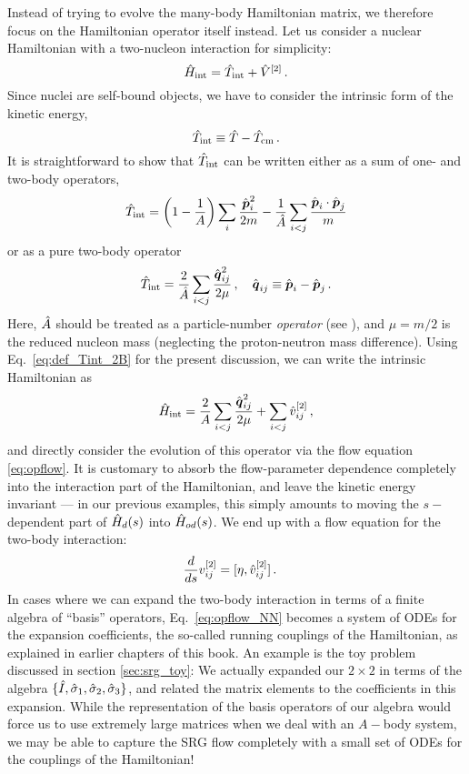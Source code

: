Instead of trying to evolve the many-body Hamiltonian matrix, we therefore focus
on the Hamiltonian operator itself instead. Let us consider a nuclear Hamiltonian 
with a two-nucleon interaction for simplicity:
\begin{equation}
  \hat{H}_\text{int} = \hat{T}_\text{int} + \hat{V}^{[2]}\,.
\end{equation}
Since nuclei are self-bound objects, we have to consider the intrinsic form of the 
kinetic energy, 
\begin{equation}
  \hat{T}_\text{int} \equiv \hat{T} - \hat{T}_\text{cm}\,.
\end{equation}
It is straightforward to show that $\hat{T}_\text{int}$ can be written either as a sum of
one- and two-body operators,
\begin{equation}\label{eq:def_Tint_1B2B}
  \Tint= \left(1-\frac{1}{A}\right)\sum_{i}\frac{\pOV_i^2}{2m} - \frac{1}{\AO}\sum_{i<j}\frac{\pOV_{i}\cdot\pOV_{j}}{m}
\end{equation}
or as a pure two-body operator
\begin{equation}\label{eq:def_Tint_2B}
  \Tint= \frac{2}{\AO}\sum_{i<j}\frac{\qOV_{ij}^2}{2\mu}\,,\quad \qOV_{ij}\equiv\pOV_{i}-\pOV_{j}\,.
\end{equation}
Here, $\hat{A}$ should be treated as a particle-number \emph{operator} (see \cite{Hergert:2009wh}),
and $\mu=m/2$ is the reduced nucleon mass (neglecting the proton-neutron mass difference).
Using Eq.~\eqref{eq:def_Tint_2B} for the present discussion, we can write the intrinsic 
Hamiltonian as
\begin{equation}
  \Hint = \frac{2}{A}\sum_{i<j}\frac{\qOV_{ij}^2}{2\mu} + \sum_{i<j}\vO^{[2]}_{ij}\,,
\end{equation}
and directly consider the evolution of this operator via the flow equation
\eqref{eq:opflow}. It is customary to absorb the flow-parameter dependence 
completely into the interaction part of the Hamiltonian, and leave the kinetic
energy invariant --- in our previous examples, this simply amounts to moving the
$s-$dependent part of $\hat{H}_d(s)$ into $\hat{H}_{od}(s)$. We end up with a flow equation 
for the two-body interaction:
\begin{align}\label{eq:opflow_NN}
  \totd{}{s}v^{[2]}_{ij} &= \comm{\eta}{\vO^{[2]}_{ij}}\,.
\end{align}
In cases where we can expand the two-body interaction in terms of a finite algebra of
``basis'' operators, Eq.~\eqref{eq:opflow_NN} becomes a system of ODEs for the expansion 
coefficients, the so-called running couplings of the Hamiltonian, as explained
in earlier chapters of this book. An example is the toy problem discussed in section 
\ref{sec:srg_toy}: We actually expanded our $2\times2$ in terms of the algebra 
$\{\hat{I},\hat{\sigma}_{1},\hat{\sigma}_{2},\hat{\sigma}_{3}\}$,
and related the matrix elements to the coefficients in this expansion. While 
the representation of the basis operators of our algebra would force us to use
extremely large matrices when we deal with an $A-$body system, we may be able
to capture the SRG flow completely with a small set of ODEs for the couplings 
of the Hamiltonian!

